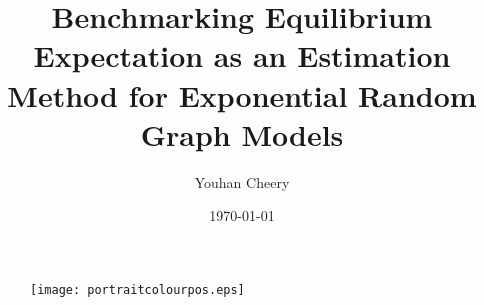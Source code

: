 \documentclass[12pt]{article}
\title{Benchmarking Equilibrium Expectation as an Estimation Method for Exponential Random Graph Models}
\author{Youhan Cheery}
\date{\today}
\begin{document}
\maketitle
\begin{figure}
\centering
\texttt{[image: portraitcolourpos.eps]}
\end{figure}


\pagebreak
\tableofcontents
\pagebreak
\listoftables
\listoffigures
\pagebreak



















\end{document}
